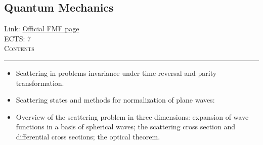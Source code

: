 \documentclass[11pt, a4paper]{article}
\newenvironment{course}[3]{
\subsection{#1}%
Link: \href{#2}{Official FMF page}\\%
ECTS: #3%
\vspace{1ex}
\\
{\large \textsc{Contents}}\\[-0.9ex]%
\rule{\textwidth}{0.5pt}
\vspace{-3ex}
}
{}
\newenvironment{chapter}[1]{
\begin{tcolorbox}[title=#1, breakable]
}
{\end{tcolorbox}}
\begin{document}
\begin{course}{Quantum Mechanics}{https://www.fmf.uni-lj.si/en/study-physics/programmes/1fiz/2020/7000777/courses/1156/}{7}
\begin{chapter}{Introduction to scattering}
\begin{itemize}
            \item Scattering in problems invariance under time-reversal and parity transformation.

            \item Scattering states and methods for normalization of plane waves:

            \item Overview of the scattering problem in three dimensions: expansion of wave functions in a basis of spherical waves; the scattering cross section and differential cross sections; the optical theorem.
        
        \end{itemize}
    \end{chapter}

\end{course}
\end{document}
